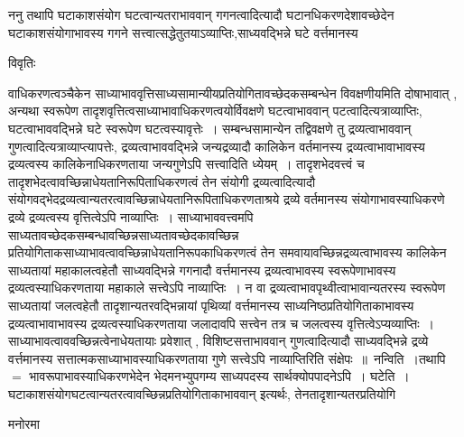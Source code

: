 \documentclass[10pt, openany]{book}
\begin{document}
{{\la ननु तथापि घटाकाशसंयोग {\vpc घटत्वान्यतराभाववान्} गगनत्वादित्यादौ घटानधिकरणदेशावच्छेदेन घटाकाशसंयोगाभावस्य गगने सत्त्वात्सद्धेतुतयाऽव्याप्तिः,साध्यवद्भिन्ने घटे वर्त्तमानस्य }
\begin{center}     विवृतिः \end{center}
वाधिकरणत्वञ्चैकेन साध्याभाववृत्तिसाध्यसामान्यीयप्रतियोगितावच्छेदकसम्बन्धेन विवक्षणीयमिति दोषाभावात् , अन्यथा स्वरूपेण तादृशवृत्तित्वसाध्याभावाधिकरणत्वयोर्विवक्षणे घटत्वाभाववान् पटत्वादित्यत्राव्याप्तिः, घटत्वाभाववद्भिन्ने घटे स्वरूपेण घटत्वस्यावृत्तेः~। सम्बन्धसामान्येन तद्विवक्षणे तु
द्रव्यत्वाभाववान् गुणत्वादित्यत्राव्याप्त्यापत्तेः, द्रव्यत्वाभाववद्भिन्ने जन्यद्रव्यादौ कालिकेन वर्तमानस्य द्रव्यत्वाभावाभावस्य द्रव्यत्वस्य कालिकेनाधिकरणताया जन्यगुणेऽपि
सत्त्वादिति ध्येयम्~। तादृशभेदवत्त्वं च तादृशभेदत्वावच्छिन्नाधेयतानिरूपिताधिकरणत्वं तेन संयोगी द्रव्यत्वादित्यादौ
संयोगवद्भेदद्रव्यत्वान्यतरत्वावच्छिन्नाधेयतानिरूपिताधिकरणताश्रये द्रव्ये वर्तमानस्य संयोगाभावस्याधिकरणे द्रव्ये द्रव्यत्वस्य वृत्तित्वेऽपि नाव्याप्तिः~। साध्याभाववत्त्वमपि
साध्यतावच्छेदकसम्बन्धावच्छिन्नसाध्यतावच्छेदकावच्छिन्न प्रतियोगिताकसाध्याभावत्वावच्छिन्नाधेयतानिरूपकाधिकरणत्वं तेन समवायावच्छिन्नद्रव्यत्वाभावस्य कालिकेन साध्यतायां महाकालत्वहेतौ साध्यवद्भिन्ने गगनादौ वर्त्तमानस्य द्रव्यत्वाभावस्य स्वरूपेणाभावस्य द्रव्यत्वस्याधिकरणताया महाकाले सत्त्वेऽपि नाव्याप्तिः~। न वा
द्रव्यत्वाभावपृथ्वीत्वाभावान्यतरस्य स्वरूपेण साध्यतायां जलत्वहेतौ तादृशान्यतरवद्भिन्नायां पृथिव्यां वर्त्तमानस्य साध्यनिष्ठप्रतियोगिताकाभावस्य द्रव्यत्वाभावाभावस्य
द्रव्यत्वस्याधिकरणताया जलादावपि सत्त्वेन तत्र च जलत्वस्य वृत्तित्वेऽप्यव्याप्तिः~। साध्याभावत्वाववच्छिन्नत्वेनाधेयतायाः प्रवेशात् , विशिष्टसत्ताभाववान् गुणत्वादित्यादौ
साध्यवद्भिन्ने द्रव्ये वर्त्तमानस्य सत्तात्मकसाध्याभावस्याधिकरणताया गुणे सत्त्वेऽपि नाव्याप्तिरिति संक्षेपः~॥~{\la नन्विति~}।तथापि $=$ भावरूपाभावस्याधिकरणभेदेन भेदमनभ्युपगम्य साध्यपदस्य सार्थक्योपपादनेऽपि~। घटेति~। घटाकाशसंयोगघटत्वान्यतरत्वावच्छिन्नप्रतियोगिताकाभाववान् इत्यर्थः, तेनतादृशान्यतरप्रतियोगि
\begin{center}   मनोरमा  \end{center}

}
\end{document}
